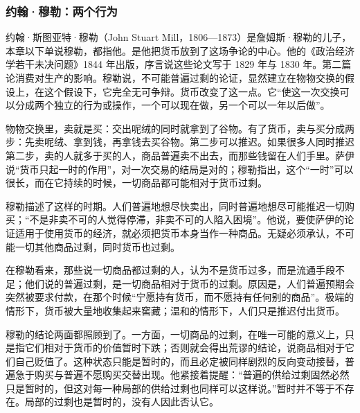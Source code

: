 
\subsubsection{约翰·穆勒：两个行为}
约翰·斯图亚特·穆勒（John Stuart Mill，1806—1873）是詹姆斯·穆勒的儿子，本章以下单说穆勒，都指他。是他把货币放到了这场争论的中心。他的《政治经济学若干未决问题》1844 年出版，序言说这些论文写于 1829 年与 1830 年\cite{jsmill1844}。第二篇论消费对生产的影响。穆勒说，不可能普遍过剩的论证，显然建立在物物交换的假设上，在这个假设下，它完全无可争辩\cite{jsmill1844}。货币改变了这一点。它“使这一次交换可以分成两个独立的行为或操作，一个可以现在做，另一个可以一年以后做”\cite{jsmill1844}。

\begin{intuition}[两个行为]
物物交换里，卖就是买：交出呢绒的同时就拿到了谷物。有了货币，卖与买分成两步：先卖呢绒、拿到钱，再拿钱去买谷物。第二步可以推迟。如果很多人同时推迟第二步，卖的人就多于买的人，商品普遍卖不出去，而那些钱留在人们手里。萨伊说“货币只起一时的作用”，对一次交易的结局是对的；穆勒指出，这个“一时”可以很长，而在它持续的时候，一切商品都可能相对于货币过剩。
\end{intuition}

穆勒描述了这样的时期。人们普遍地想尽快卖出，同时普遍地想尽可能推迟一切购买；“不是非卖不可的人觉得停滞，非卖不可的人陷入困境”\cite{jsmill1844}。他说，要使萨伊的论证适用于使用货币的经济，就必须把货币本身当作一种商品。无疑必须承认，不可能一切其他商品过剩，同时货币也过剩\cite{jsmill1844}。

在穆勒看来，那些说一切商品都过剩的人，认为不是货币过多，而是流通手段不足；他们说的普遍过剩，是一切商品相对于货币的过剩\cite{jsmill1844}。原因是，人们普遍预期会突然被要求付款，在那个时候“宁愿持有货币，而不愿持有任何别的商品”。极端的情形下，货币被大量地收集起来窖藏；温和的情形下，人们只是推迟付出货币\cite{jsmill1844}。

穆勒的结论两面都照顾到了。一方面，一切商品的过剩，在唯一可能的意义上，只是指它们相对于货币的价值暂时下跌；否则就会得出荒谬的结论，说商品相对于它们自己贬值了\cite{jsmill1844}。这种状态只能是暂时的，而且必定被同样剧烈的反向变动接替，普遍急于购买与普遍不愿购买交替出现\cite{jsmill1844}。他紧接着提醒：“普遍的供给过剩固然必然只是暂时的，但这对每一种局部的供给过剩也同样可以这样说。”\cite{jsmill1844}暂时并不等于不存在。局部的过剩也是暂时的，没有人因此否认它。

